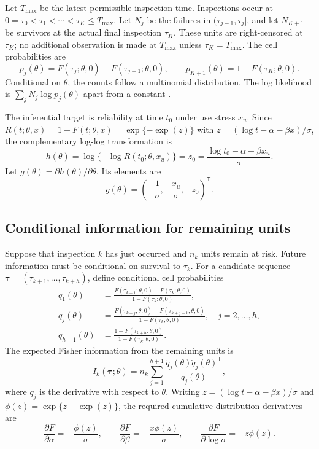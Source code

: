 \documentclass[a4paper,fleqn]{cas-sc}
\begin{document}
Let $T_{\max}$ be the latest permissible inspection time. Inspections occur at $0=\tau_0<\tau_1<\cdots<\tau_K\leq T_{\max}$. Let $N_j$ be the failures in $(\tau_{j-1},\tau_j]$, and let $N_{K+1}$ be survivors at the actual final inspection $\tau_K$. These units are right-censored at $\tau_K$; no additional observation is made at $T_{\max}$ unless $\tau_K=T_{\max}$. The cell probabilities are
\begin{equation}
p_j(\theta)=F(\tau_j;\theta,0)-F(\tau_{j-1};\theta,0),\qquad
p_{K+1}(\theta)=1-F(\tau_K;\theta,0).
\end{equation}
Conditional on $\theta$, the counts follow a multinomial distribution. The log likelihood is $\sum_jN_j\log p_j(\theta)$ apart from a constant \citep{sun2006}.

The inferential target is reliability at time $t_0$ under use stress $x_u$. Since $R(t;\theta,x)=1-F(t;\theta,x)=\exp\{-\exp(z)\}$ with $z=(\log t-\alpha-\beta x)/\sigma$, the complementary log-log transformation is
\begin{equation}
h(\theta)=\log\{-\log R(t_0;\theta,x_u)\}
=z_0=\frac{\log t_0-\alpha-\beta x_u}{\sigma}.
\label{eq:target}
\end{equation}
Let $g(\theta)=\partial h(\theta)/\partial\theta$. Its elements are
\begin{equation}
g(\theta)=\left(-\frac{1}{\sigma},-\frac{x_u}{\sigma},-z_0\right)^{\mathsf T}.
\end{equation}

\subsection{Conditional information for remaining units}

Suppose that inspection $k$ has just occurred and $n_k$ units remain at risk. Future information must be conditional on survival to $\tau_k$. For a candidate sequence $\boldsymbol\tau=(\tau_{k+1},\ldots,\tau_{k+h})$, define conditional cell probabilities
\begin{align}
q_1(\theta)&=\frac{F(\tau_{k+1};\theta,0)-F(\tau_k;\theta,0)}{1-F(\tau_k;\theta,0)},\\
q_j(\theta)&=\frac{F(\tau_{k+j};\theta,0)-F(\tau_{k+j-1};\theta,0)}{1-F(\tau_k;\theta,0)},\quad j=2,\ldots,h,\\
q_{h+1}(\theta)&=\frac{1-F(\tau_{k+h};\theta,0)}{1-F(\tau_k;\theta,0)}.
\end{align}
The expected Fisher information from the remaining units is
\begin{equation}
I_k(\boldsymbol\tau;\theta)=n_k\sum_{j=1}^{h+1}
\frac{\dot q_j(\theta)\dot q_j(\theta)^{\mathsf T}}{q_j(\theta)},
\label{eq:information}
\end{equation}
where $\dot q_j$ is the derivative with respect to $\theta$. Writing $z=(\log t-\alpha-\beta x)/\sigma$ and $\phi(z)=\exp\{z-\exp(z)\}$, the required cumulative distribution derivatives are
\begin{equation}
\frac{\partial F}{\partial\alpha}=-\frac{\phi(z)}{\sigma},\qquad
\frac{\partial F}{\partial\beta}=-\frac{x\phi(z)}{\sigma},\qquad
\frac{\partial F}{\partial\log\sigma}=-z\phi(z).
\end{equation}
\end{document}
